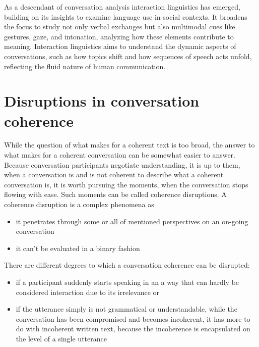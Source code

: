 \documentclass[12pt]{report}
\begin{document}
{\par
As a descendant of conversation analysis interaction linguistics has emerged,
building on its insights to examine language use in social contexts.
It broadens the focus to study not only verbal exchanges but also
multimodal cues like gestures, gaze, and intonation,
analyzing how these elements contribute to meaning.
Interaction linguistics aims to understand the dynamic aspects of conversations,
such as how topics shift and how sequences of speech acts unfold,
reflecting the fluid nature of human communication.

\section{Disruptions in conversation coherence}
\par
While the question of what makes for a coherent text is too broad,
the answer to what makes for a coherent conversation can be somewhat easier to answer.
Because conversation participants negotiate understanding,
it is up to them, when a conversation is and is not coherent
to describe what a coherent conversation is,
it is worth pursuing the moments, when the conversation stops flowing with ease.
Such moments can be called coherence disruptions.
A coherence disruption is a complex phenomena as

\begin{itemize}
\item
it penetrates through some or all of mentioned perspectives on an on-going conversation
\item
it can't be evaluated in a binary fashion
\end{itemize}

There are different degrees to which a conversation coherence can be disrupted:
\begin{itemize}

\item
   if a participant suddenly starts speaking
    in an a way that can hardly be considered interaction
    due to its irrelevance or

\item
   if the utterance simply is not grammatical or understandable,
    while the conversation has been compromised and becomes incoherent,
    it has more to do with incoherent written text, because
    the incoherence is encapsulated on the level of a single utterance
\end{itemize}

}
\end{document}
